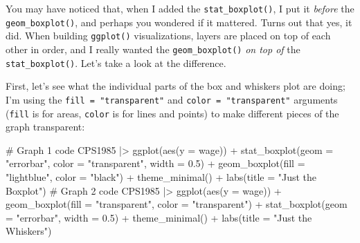 \documentclass[
  letterpaper,
]{book}
\newenvironment{Shaded}{\begin{snugshade}}{\end{snugshade}}
\newcommand{\AttributeTok}[1]{\textcolor[rgb]{0.40,0.45,0.13}{#1}}
\newcommand{\CommentTok}[1]{\textcolor[rgb]{0.37,0.37,0.37}{#1}}
\newcommand{\FloatTok}[1]{\textcolor[rgb]{0.68,0.00,0.00}{#1}}
\newcommand{\FunctionTok}[1]{\textcolor[rgb]{0.28,0.35,0.67}{#1}}
\newcommand{\NormalTok}[1]{\textcolor[rgb]{0.00,0.23,0.31}{#1}}
\newcommand{\SpecialCharTok}[1]{\textcolor[rgb]{0.37,0.37,0.37}{#1}}
\newcommand{\StringTok}[1]{\textcolor[rgb]{0.13,0.47,0.30}{#1}}
\begin{document}
\begin{tcolorbox}[enhanced jigsaw, colframe=quarto-callout-tip-color-frame, breakable, arc=.35mm, bottomtitle=1mm, bottomrule=.15mm, colbacktitle=quarto-callout-tip-color!10!white, rightrule=.15mm, colback=white, opacityback=0, opacitybacktitle=0.6, coltitle=black, left=2mm, toptitle=1mm, toprule=.15mm, titlerule=0mm, leftrule=.75mm, title=\textcolor{quarto-callout-tip-color}{\faLightbulb}\hspace{0.5em}{Data Storytelling: Layer Order Matters}]

You may have noticed that, when I added the \texttt{stat\_boxplot()}, I
put it \emph{before} the \texttt{geom\_boxplot()}, and perhaps you
wondered if it mattered. Turns out that yes, it did. When building
\texttt{ggplot()} visualizations, layers are placed on top of each other
in order, and I really wanted the \texttt{geom\_boxplot()} \emph{on top
of} the \texttt{stat\_boxplot()}. Let's take a look at the difference.

First, let's see what the individual parts of the box and whiskers plot
are doing; I'm using the \texttt{fill\ =\ "transparent"} and
\texttt{color\ =\ "transparent"} arguments (\texttt{fill} is for areas,
\texttt{color} is for lines and points) to make different pieces of the
graph transparent:

\begin{Shaded}
\begin{Highlighting}[]
\CommentTok{\# Graph 1 code}
\NormalTok{CPS1985 }\SpecialCharTok{|\textgreater{}} 
  \FunctionTok{ggplot}\NormalTok{(}\FunctionTok{aes}\NormalTok{(}\AttributeTok{y =}\NormalTok{ wage)) }\SpecialCharTok{+}
  \FunctionTok{stat\_boxplot}\NormalTok{(}\AttributeTok{geom =} \StringTok{"errorbar"}\NormalTok{,  }\AttributeTok{color =} \StringTok{"transparent"}\NormalTok{, }\AttributeTok{width =} \FloatTok{0.5}\NormalTok{) }\SpecialCharTok{+} 
  \FunctionTok{geom\_boxplot}\NormalTok{(}\AttributeTok{fill =} \StringTok{"lightblue"}\NormalTok{, }\AttributeTok{color =} \StringTok{"black"}\NormalTok{) }\SpecialCharTok{+}
  \FunctionTok{theme\_minimal}\NormalTok{() }\SpecialCharTok{+}
  \FunctionTok{labs}\NormalTok{(}\AttributeTok{title =} \StringTok{"Just the Boxplot"}\NormalTok{)}
\CommentTok{\# Graph 2 code  }
\NormalTok{CPS1985 }\SpecialCharTok{|\textgreater{}} 
  \FunctionTok{ggplot}\NormalTok{(}\FunctionTok{aes}\NormalTok{(}\AttributeTok{y =}\NormalTok{ wage)) }\SpecialCharTok{+}
  \FunctionTok{geom\_boxplot}\NormalTok{(}\AttributeTok{fill =} \StringTok{"transparent"}\NormalTok{, }\AttributeTok{color =} \StringTok{"transparent"}\NormalTok{) }\SpecialCharTok{+}
  \FunctionTok{stat\_boxplot}\NormalTok{(}\AttributeTok{geom =} \StringTok{"errorbar"}\NormalTok{, }\AttributeTok{width =} \FloatTok{0.5}\NormalTok{) }\SpecialCharTok{+} 
  \FunctionTok{theme\_minimal}\NormalTok{() }\SpecialCharTok{+}
  \FunctionTok{labs}\NormalTok{(}\AttributeTok{title =} \StringTok{"Just the Whiskers"}\NormalTok{)}
\end{Highlighting}
\end{Shaded}


\end{tcolorbox}
\end{document}
